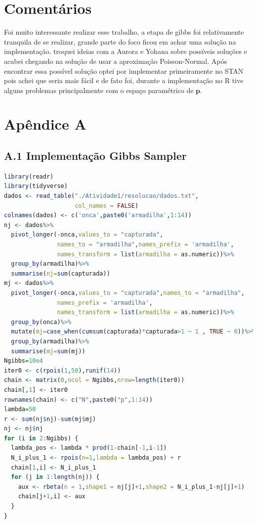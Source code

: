 \documentclass[a4paper,12pt,twoside]{article}
\begin{document}
\section{Comentários}
Foi muito interessante realizar esse trabalho, a etapa de gibbs foi relativamente tranquila de se realizar, grande parte do foco ficou em achar uma solução na implementação. troquei ideias com a Aurora e Yohana sobre possíveis soluções e acabei chegando na solução de usar a aproximação Poisson-Normal.
Após encontrar essa possível solução optei por implementar primeiramente no STAN pois achei que seria mais fácil e de fato foi, durante a implementação no R tive alguns problemas principalmente com o espaço paramétrico de $\mathbf{p}$.




\newpage

\section*{Apêndice A}
\subsection*{A.1 Implementação Gibbs Sampler}
\begin{lstlisting}[language=R]
library(readr)
library(tidyverse)
dados <- read_table("./Atividade1/resolucao/dados.txt", 
                    col_names = FALSE)
colnames(dados) <- c('onca',paste0('armadilha',1:14))
nj <- dados%>%
  pivot_longer(-onca,values_to = "capturada",
               names_to = "armadilha",names_prefix = 'armadilha',
               names_transform = list(armadilha = as.numeric))%>%
  group_by(armadilha)%>%
  summarise(nj=sum(capturada))
mj <- dados%>%
  pivot_longer(-onca,values_to = "capturada",names_to = "armadilha",
               names_prefix = 'armadilha',
               names_transform = list(armadilha = as.numeric))%>%
  group_by(onca)%>%
  mutate(mj=case_when(cumsum(capturada)*capturada>1 ~ 1 , TRUE ~ 0))%>%
  group_by(armadilha)%>%
  summarise(mj=sum(mj))
Ngibbs=10e4
iter0 <- c(rpois(1,50),runif(14))
chain <- matrix(0,ncol = Ngibbs,nrow=length(iter0))
chain[,1] <- iter0
rownames(chain) <- c("N",paste0("p",1:14))
lambda=50
r <- sum(nj$nj)-sum(mj$mj)
nj <- nj$nj 
for (i in 2:Ngibbs) {
  lambda_pos <- lambda * prod(1-chain[-1,i-1])
  N_i_plus_1 <- rpois(n=1,lambda = lambda_pos) + r
  chain[1,i] <- N_i_plus_1 
  for (j in 1:length(nj)) {
    aux <- rbeta(n = 1,shape1 = nj[j]+1,shape2 = N_i_plus_1-nj[j]+1)
    chain[j+1,i] <- aux
  }
}
\end{lstlisting}
\end{document}
